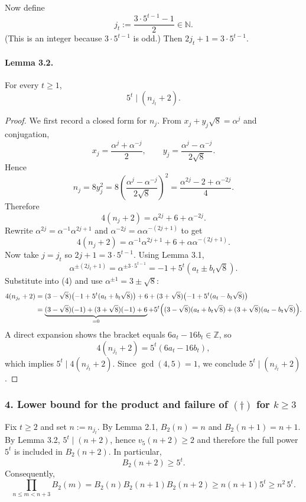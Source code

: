 Now define
\[
 j_t := \frac{3\cdot 5^{t-1}-1}{2}\in\mathbb{N}.
\]
(This is an integer because $3\cdot 5^{t-1}$ is odd.) Then $2j_t+1 = 3\cdot 5^{t-1}$.

\paragraph{Lemma 3.2.} For every $t\ge 1$,
\[
5^t \mid (n_{j_t}+2).
\]
\begin{proof}
We first record a closed form for $n_j$.
From $x_j+y_j\sqrt{8}=\alpha^j$ and conjugation,
\[
 x_j = \frac{\alpha^j+\alpha^{-j}}{2},\qquad y_j = \frac{\alpha^j-\alpha^{-j}}{2\sqrt{8}}.
\]
Hence
\[
 n_j = 8y_j^2 = 8\left(\frac{\alpha^j-\alpha^{-j}}{2\sqrt{8}}\right)^2
     = \frac{\alpha^{2j}-2+\alpha^{-2j}}{4}.
\]
Therefore
\[
4(n_j+2)=\alpha^{2j}+6+\alpha^{-2j}.
\tag{3}
\]
Rewrite $\alpha^{2j}=\alpha^{-1}\alpha^{2j+1}$ and $\alpha^{-2j}=\alpha\alpha^{-(2j+1)}$ to get
\[
4(n_j+2)=\alpha^{-1}\alpha^{2j+1}+6+\alpha\alpha^{-(2j+1)}.
\tag{4}
\]
Now take $j=j_t$ so $2j+1=3\cdot 5^{t-1}$. Using Lemma 3.1,
\[
\alpha^{\pm(2j_t+1)}=\alpha^{\pm 3\cdot 5^{t-1}}=-1+5^t(a_t\pm b_t\sqrt{8}).
\]
Substitute into (4) and use $\alpha^{\pm 1}=3\pm\sqrt{8}$:
\begin{align*}
4(n_{j_t}+2)
&=(3-\sqrt{8})\bigl(-1+5^t(a_t+b_t\sqrt{8})\bigr)+6+(3+\sqrt{8})\bigl(-1+5^t(a_t-b_t\sqrt{8})\bigr)\\
&=\underbrace{(3-\sqrt{8})(-1)+(3+\sqrt{8})(-1)+6}_{=0}
 +5^t\Bigl((3-\sqrt{8})(a_t+b_t\sqrt{8})+(3+\sqrt{8})(a_t-b_t\sqrt{8})\Bigr).
\end{align*}
A direct expansion shows the bracket equals $6a_t-16b_t\in\mathbb{Z}$, so
\[
4(n_{j_t}+2)=5^t(6a_t-16b_t),
\]
which implies $5^t\mid 4(n_{j_t}+2)$. Since $\gcd(4,5)=1$, we conclude $5^t\mid (n_{j_t}+2)$.
\end{proof}

\subsubsection*{4. Lower bound for the product and failure of $(\dagger)$ for $k\ge 3$}
Fix $t\ge 2$ and set $n:=n_{j_t}$.
By Lemma 2.1, $B_2(n)=n$ and $B_2(n+1)=n+1$.
By Lemma 3.2, $5^t\mid (n+2)$, hence $v_5(n+2)\ge 2$ and therefore the full power $5^t$ is included in $B_2(n+2)$. In particular,
\[
B_2(n+2)\ge 5^t.
\]
Consequently,
\[
\prod_{n\le m<n+3} B_2(m) = B_2(n)B_2(n+1)B_2(n+2) \ge n(n+1)5^t \ge n^2\,5^t.
\tag{5}
\]

